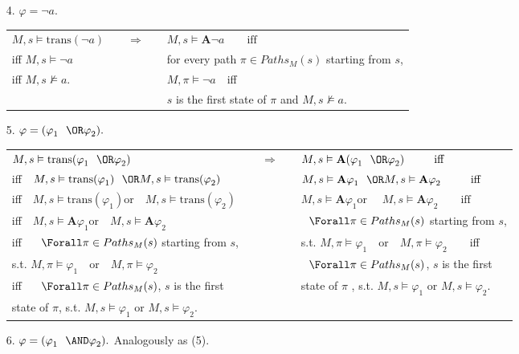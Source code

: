 {\begin{enumerate}
\item[4.] $\varphi =\lnot a.$

\begin{tabular}{lcl}
$M,s\vDash \mathrm{trans}(\lnot a)$ & $\quad \Rightarrow \quad $ & $%
M,s\vDash \mathbf{A\lnot }a\qquad \text{iff}$ \\ 
iff $M,s\vDash \lnot a$ &  & for every path $\pi \in Paths_{M}(s)$ starting
from $s$, \\ 
iff $M,s\nvDash a$. &  &  $M,\pi \vDash \lnot a\quad $iff \\ 
&  & $s$ is the first state of $\pi $ and $M,s\nvDash a$.%
\end{tabular}

\item[5.] $\varphi =(\varphi _{1}\OR\varphi _{2}).$

\begin{tabular}{lcl}
$M,s\vDash \mathrm{trans}(\varphi _{1}\OR\varphi _{2})$ & $\quad \Rightarrow
\quad $ & $M,s\vDash \mathbf{A}(\varphi _{1}\OR\varphi _{2})\qquad \text{iff}
$ \\ 
iff$\quad M,s\vDash \mathrm{trans}(\varphi _{1})\OR M,s\vDash \mathrm{trans}%
(\varphi _{2})$ &  & $M,s\vDash \mathbf{A}\varphi _{1}\OR M,s\vDash \mathbf{A%
}\varphi _{2}\qquad \text{iff}$ \\ 
iff$\quad M,s\vDash \mathrm{trans}(\varphi _{1})$\quad or$\quad M,s\vDash 
\mathrm{trans}(\varphi _{2})$ &  & $M,s\vDash \mathbf{A}\varphi _{1}$\quad or%
$\quad M,s\vDash \mathbf{A}\varphi _{2}\qquad \text{iff}$ \\ 
iff$\quad M,s\vDash \mathbf{A}\varphi _{1}$\quad or$\quad M,s\vDash \mathbf{A%
}\varphi _{2}$ &  & $\Forall\pi \in Paths_{M}(s)$ starting from $s$, \\ 
iff$\quad \Forall\pi \in Paths_{M}(s)$ starting from $s$, &  & s.t. $M,\pi
\vDash \varphi _{1}\quad $or$\quad M,\pi \vDash \varphi _{2}\qquad $iff \\ 
s.t. $M,\pi \vDash \varphi _{1}\quad $or$\quad M,\pi \vDash \varphi _{2}$ & 
& $\Forall\pi \in Paths_{M}(s)$, $s$ is the first \\ 
iff$\quad \Forall\pi \in Paths_{M}(s)$, $s$ is the first &  & state of $\pi $%
, s.t. $M,s\vDash \varphi _{1}$ or $M,s\vDash \varphi _{2}$. \\ 
state of $\pi $, s.t. $M,s\vDash \varphi _{1}$ or $M,s\vDash \varphi _{2}$.
&  & 
\end{tabular}

\item[6.] $\varphi =(\varphi _{1}\AND\varphi _{2}).$ Analogously as (5).


\end{enumerate}}
